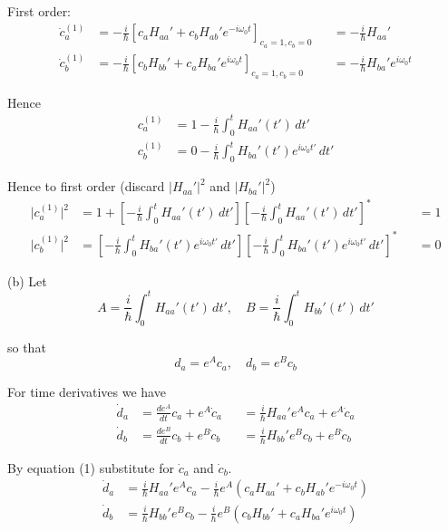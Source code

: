 First order:
\begin{align*}
\dot c_a^{(1)}&=-\frac{i}{\hbar}\left[c_aH_{aa}'+c_bH_{ab}'e^{-i\omega_0t}\right]_{c_a=1,c_b=0}
&&=-\frac{i}{\hbar}H_{aa}'
\\
\dot c_b^{(1)}&=-\frac{i}{\hbar}\left[c_bH_{bb}'+c_aH_{ba}'e^{i\omega_0t}\right]_{c_a=1,c_b=0}
&&=-\frac{i}{\hbar}H_{ba}'e^{i\omega_0t}
\end{align*}

Hence
\begin{align*}
c_a^{(1)}&=1-\frac{i}{\hbar}\int_0^tH_{aa}'(t')\,dt'
\\
c_b^{(1)}&=0-\frac{i}{\hbar}\int_0^tH_{ba}'(t')e^{i\omega_0t'}\,dt'
\end{align*}

Hence to first order (discard $|H_{aa}'|^2$ and $|H_{ba}'|^2$)
\begin{align*}
\bigl|c_a^{(1)}\bigr|^2&=1+\left[-\frac{i}{\hbar}\int_0^tH_{aa}'(t')\,dt'\right]
\left[-\frac{i}{\hbar}\int_0^tH_{aa}'(t')\,dt'\right]^*
& {}&=1
\\
\bigl|c_b^{(1)}\bigr|^2&=\left[-\frac{i}{\hbar}\int_0^tH_{ba}'(t')e^{i\omega_0t'}\,dt'\right]
\left[-\frac{i}{\hbar}\int_0^tH_{ba}'(t')e^{i\omega_0t'}\,dt'\right]^*
& {}&=0
\end{align*}

(b) Let
\begin{equation*}
A=\frac{i}{\hbar}\int_0^tH_{aa}'(t')\,dt',\quad
B=\frac{i}{\hbar}\int_0^tH_{bb}'(t')\,dt'
\end{equation*}

so that
\begin{equation*}
d_a=e^Ac_a,\quad d_b=e^Bc_b
\tag{2}
\end{equation*}

For time derivatives we have
\begin{align*}
\dot d_a&=\frac{de^A}{dt}c_a+e^A\dot c_a&&=\frac{i}{\hbar}H_{aa}'e^Ac_a+e^A\dot c_a
\\
\dot d_b&=\frac{de^B}{dt}c_b+e^B\dot c_b&&=\frac{i}{\hbar}H_{bb}'e^Bc_b+e^B\dot c_b
\end{align*}

By equation (1) substitute for $\dot c_a$ and $\dot c_b$.
\begin{align*}
\dot d_a&=\frac{i}{\hbar}H_{aa}'e^Ac_a
-\frac{i}{\hbar}e^A\left(c_aH_{aa}'+c_bH_{ab}'e^{-i\omega_0t}\right)
\\
\dot d_b&=\frac{i}{\hbar}H_{bb}'e^Bc_b
-\frac{i}{\hbar}e^B\left(c_bH_{bb}'+c_aH_{ba}'e^{i\omega_0t}\right)
\end{align*}

